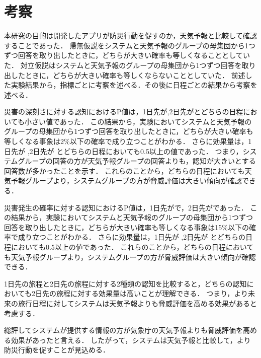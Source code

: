 \section{考察}
本研究の目的は開発したアプリが防災行動を促すのか，天気予報と比較して確認することであった．
帰無仮説をシステムと天気予報のグループの母集団から1つずつ回答を取り出したときに，どちらが大きい確率も等しくなることとしていた．
対立仮説はシステムと天気予報のグループの母集団から1つずつ回答を取り出したときに，どちらが大きい確率も等しくならないこととしていた．
前述した実験結果から，指標ごとに考察を述べる．その後に日程ごとの結果から考察を述べる．

災害の深刻さに対する認知におけるP値は，1日先が\quad{},2日先が\quad{}とどちらの日程においても小さい値であった．
この結果から，実験においてシステムと天気予報のグループの母集団から1つずつ回答を取り出したときに，どちらが大きい確率も等しくなる事象は2\%以下の確率で成り立つことがわかる．
さらに効果量は，1日先が \quad{},2日先が \quad{}とどちらの日程においても0.5以上の値であった．
つまり，システムグループの回答の方が天気予報グループの回答よりも，認知が大きいとする回答数が多かったことを示す．
これらのことから，どちらの日程においても天気予報グループより，システムグループの方が脅威評価は大きい傾向が確認できる．

災害発生の確率に対する認知におけるP値は，1日先が\quad{}で，2日先が\quad{}であった．
この結果から，実験においてシステムと天気予報のグループの母集団から1つずつ回答を取り出したときに，どちらが大きい確率も等しくなる事象は15\%以下の確率で成り立つことがわかる．
さらに効果量は，1日先が \quad{},2日先が \quad{}とどちらの日程においても0.5以上の値であった．
これらのことから，どちらの日程においても天気予報グループより，システムグループの方が脅威評価は大きい傾向が確認できる．

1日先の旅程と2日先の旅程に対する2種類の認知を比較すると，どちらの認知においても2日先の旅程に対する効果量は高いことが理解できる．
つまり，より未来の旅行日程に対してシステムは天気予報よりも脅威評価を高める効果があると考慮する．

総評してシステムが提供する情報の方が気象庁の天気予報よりも脅威評価を高める効果があったと言える．
したがって，システムは天気予報と比較して，より防災行動を促すことが見込める．
